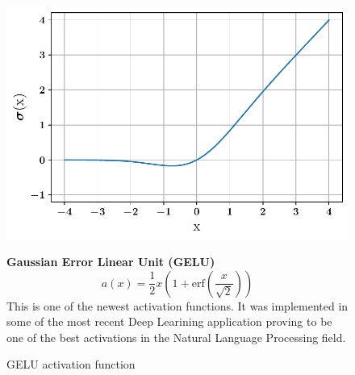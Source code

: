 \begin{figure}[!h]
\begin{minipage}{0.45\textwidth}
    \centering
\includegraphics[width=\textwidth]{images/networks/act_gelu.pdf}
\caption{GELU activation function}
    \label{fig:gelu}
\end{minipage}
\hfill
\begin{minipage}{0.5\textwidth}
    \textbf{Gaussian Error Linear Unit (GELU)}
   \begin{equation}
       a(x) = \frac{1}{2} x \left( 1+\text{erf} \left( \frac{x}{\sqrt{2}}\right)\right)
   \end{equation}
   This is one of the newest activation functions. It was implemented in some of the most recent Deep Learining application proving to be one of the best activations in the Natural Language Processing field. 
\end{minipage}
\end{figure}

